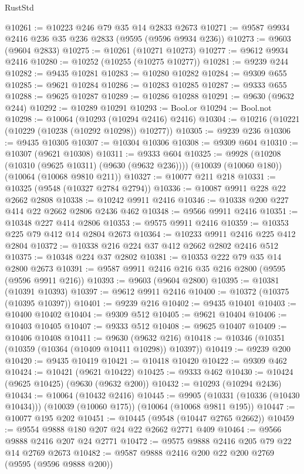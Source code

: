 \begin{lexlean}{RustStd}
\begin{coremodule}
@10261 := @10223 @246 @79 @35 @14 @2833 @2673
@10271 := @9587 @9934 @2416 @236 @35 @236 @2833 (@9595 (@9596 @9934 @236))
@10273 := @9603 (@9604 @2833)
@10275 := @10261 (@10271 @10273)
@10277 := @9612 @9934 @2416
@10280 := @10252 (@10255 (@10275 @10277))
@10281 := @9239 @244
@10282 := @9435 @10281
@10283 := @10280 @10282
@10284 := @9309 @655
@10285 := @9621 @10284
@10286 := @10283 @10285
@10287 := @9333 @655
@10288 := @9625 @10287
@10289 := @10286 @10288
@10291 := @9630 (@9632 @244)
@10292 := @10289 @10291
@10293 := Bool.or
@10294 := Bool.not
@10298 := @10064 (@10293 (@10294 @2416) @2416)
@10304 := @10216 (@10221 (@10229 (@10238 (@10292 @10298)) @10277))
@10305 := @9239 @236
@10306 := @9435 @10305
@10307 := @10304 @10306
@10308 := @9309 @604
@10310 := @10307 (@9621 @10308)
@10311 := @9333 @604
@10325 := @9928
    (@10208 (@10310 (@9625 @10311) (@9630 (@9632 @236))))
    (@10039 (@10060 @180))
    (@10064 (@10068 @9810 @211))
@10327 := @10077 @211 @218
@10331 := @10325 (@9548 (@10327 @2784 @2794))
@10336 := @10087 @9911 @228 @22 @2662 @2808
@10338 := @10242 @9911 @2416
@10346 := @10338 @200 @227 @414 @22 @2662 @2806 @2436 @462
@10348 := @9566 @9911 @2416
@10351 := @10348 @227 @414 @2806
@10353 := @9575 @9911 @2416
@10359 := @10353 @225 @79 @412 @14 @2804 @2673
@10364 := @10233 @9911 @2416 @225 @412 @2804
@10372 := @10338 @216 @224 @37 @412 @2662 @2802 @2416 @512
@10375 := @10348 @224 @37 @2802
@10381 := @10353 @222 @79 @35 @14 @2800 @2673
@10391 := @9587 @9911 @2416 @216 @35 @216 @2800 (@9595 (@9596 @9911 @216))
@10393 := @9603 (@9604 @2800)
@10395 := @10381 (@10391 @10393)
@10397 := @9612 @9911 @2416
@10400 := @10372 (@10375 (@10395 @10397))
@10401 := @9239 @216
@10402 := @9435 @10401
@10403 := @10400 @10402
@10404 := @9309 @512
@10405 := @9621 @10404
@10406 := @10403 @10405
@10407 := @9333 @512
@10408 := @9625 @10407
@10409 := @10406 @10408
@10411 := @9630 (@9632 @216)
@10418 := @10346 (@10351 (@10359 (@10364 (@10409 @10411 @10298)) @10397))
@10419 := @9239 @200
@10420 := @9435 @10419
@10421 := @10418 @10420
@10422 := @9309 @462
@10424 := @10421 (@9621 @10422)
@10425 := @9333 @462
@10430 := @10424 (@9625 @10425) (@9630 (@9632 @200))
@10432 := @10293 (@10294 @2436)
@10434 := @10064 (@10432 @2416)
@10445 := @9905
    (@10331 (@10336 (@10430 @10434)))
    (@10039 (@10060 @175))
    (@10064 (@10068 @9811 @195))
@10447 := @10077 @195 @202
@10451 := @10445 (@9548 (@10447 @2765 @2662))
@10459 := @9554 @9888 @180 @207 @24 @22 @2662 @2771 @409
@10464 := @9566 @9888 @2416 @207 @24 @2771
@10472 := @9575 @9888 @2416 @205 @79 @22 @14 @2769 @2673
@10482 := @9587 @9888 @2416 @200 @22 @200 @2769 (@9595 (@9596 @9888 @200))

\end{coremodule}
\end{lexlean}
